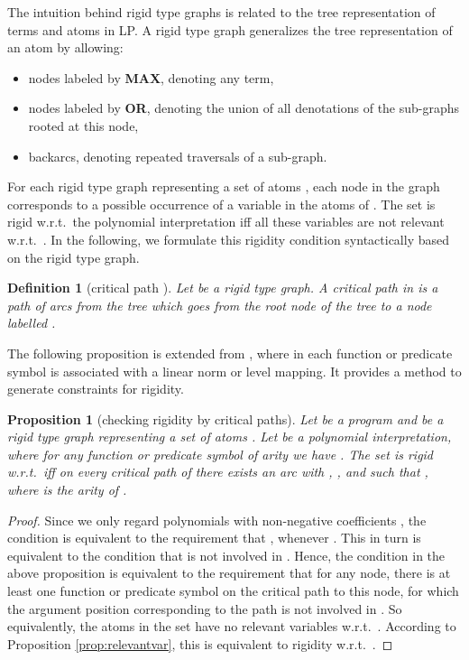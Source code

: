 \documentclass[envcountsame]{tlp}
\newcounter{ex:der-lastsymconsctr}
\newtheorem{definition}{Definition}
\newtheorem{proposition}{Proposition}
\begin{document}
The intuition behind rigid type graphs is related to the tree representation 
of terms and atoms in LP. A rigid type graph generalizes the tree representation
of an atom by allowing:
\begin{itemize}
\item nodes labeled by \mbox{\rm \textbf{MAX}}, denoting any term,
\item nodes labeled by \mbox{\rm \textbf{OR}}, denoting the union of all denotations of the sub-graphs rooted at this node,
\item backarcs, denoting repeated traversals of a sub-graph.
\end{itemize}


For each rigid type graph representing a set of atoms , each node  in
the graph corresponds to a possible occurrence of a variable in the atoms of . The
set  is rigid w.r.t.\ the polynomial interpretation  iff all these variables
are not relevant w.r.t.\ . In the following, we formulate this
rigidity condition syntactically based on the rigid type graph.
\begin{definition}[critical path \protect\cite{Decorteetal98}]
\label{criticalpath}
    Let  be a rigid type graph. A 
critical path in  is a path of arcs from the tree  which goes from
the root node of the tree to a node 
labelled . 
\end{definition}


The following proposition is extended from \cite{Decorteetal93}, where in
\cite{Decorteetal93} each function or predicate symbol is associated with a
linear norm or level mapping. It provides a method to generate 
constraints for rigidity.



\begin{proposition}[checking rigidity by critical paths]
\label{rigiditysyntax}
    Let  be a program and  be
a rigid type graph representing a set of atoms . Let
 be a polynomial
interpretation, where for any function or predicate symbol  of arity  we
have . 
The set  is rigid w.r.t.\  iff 
on every critical path of  there exists an arc 
with , , and  such that
, where  is the arity of .
\end{proposition}
\begin{proof}
Since we only regard polynomials with non-negative
coefficients
, 
the condition  
is equivalent to the requirement that , whenever
. This in turn is equivalent to the condition that  is not 
involved in . Hence, the condition in the above proposition
is equivalent to the requirement that
for any 
node, there is at least one function or predicate symbol  on the critical path to this
 node, for 
which the argument position corresponding to the path is not involved in
. So equivalently, the atoms in the set  have no relevant variables
w.r.t.\ .
According to Proposition \ref{prop:relevantvar}, this is equivalent to rigidity 
w.r.t.\ .
\end{proof}
\end{document}
